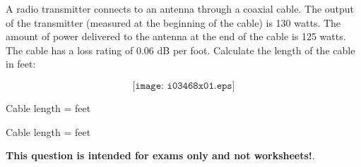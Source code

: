 

A radio transmitter connects to an antenna through a coaxial cable.  The output of the transmitter (measured at the beginning of the cable) is 130 watts.  The amount of power delivered to the antenna at the end of the cable is 125 watts.  The cable has a loss rating of 0.06 dB per foot.  Calculate the length of the cable in feet:

$$\texttt{[image: i03468x01.eps]}$$

Cable length = \underbar{\hskip 50pt} feet







Cable length =  feet







{\bf This question is intended for exams only and not worksheets!}.



